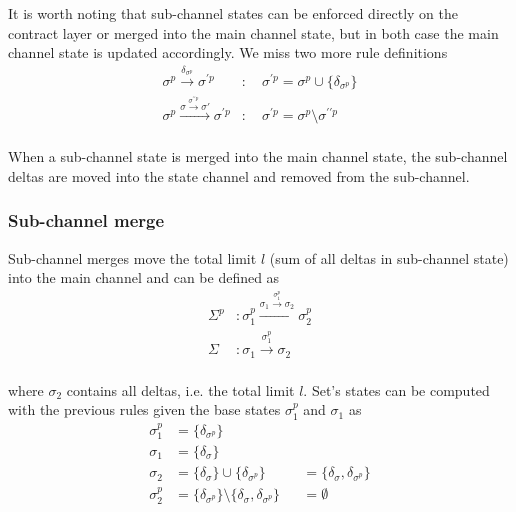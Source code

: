\documentclass{llncs}
\begin{document}
It is worth noting that sub-channel states can be enforced directly on the contract layer or merged into the main channel state, but in both case the main channel state is updated accordingly. We miss two more rule definitions
\begin{equation*}
\begin{split}
    \sigma^p \xrightarrow{\delta_{\sigma^p}} \sigma^{\prime p} &: \quad \sigma^{\prime p} = \sigma^p \cup \{ \delta_{\sigma^p} \} \\
    \sigma^p \xrightarrow{\sigma \xrightarrow{\sigma^{\prime\prime p}} \sigma'} \sigma^{\prime p} &: \quad \sigma^{\prime p} = \sigma^p \setminus \sigma^{\prime\prime p} \\
\end{split}
\end{equation*}

When a sub-channel state is merged into the main channel state, the sub-channel deltas are moved into the state channel and removed from the sub-channel.

\subsubsection{Sub-channel merge} Sub-channel merges move the total limit $l$ (sum of all deltas in sub-channel state) into the main channel and can be defined as
\begin{equation*}
\begin{split}
    \Sigma^p&: \sigma_1^p \xrightarrow{\sigma_1 \xrightarrow{\sigma_1^p} \sigma_2} \sigma_2^p \\
    \Sigma&: \sigma_1 \xrightarrow{\sigma_1^p} \sigma_2 \\
\end{split}
\end{equation*}

where $\sigma_2$ contains all deltas, i.e. the total limit $l$. Set's states can be computed with the previous rules given the base states $\sigma^p_1$ and $\sigma_1$ as
\begin{align*}
    \sigma^p_1 &= \{\delta_{\sigma^p}\} \\
    \sigma_1   &= \{\delta_\sigma\} \\
    \sigma_2   &= \{\delta_\sigma\} \cup \{\delta_{\sigma^p}\} & &= \{\delta_\sigma,\delta_{\sigma^p}\} \\
    \sigma^p_2 &= \{\delta_{\sigma^p}\} \setminus \{\delta_\sigma,\delta_{\sigma^p}\} & &= \emptyset
\end{align*}
\end{document}
